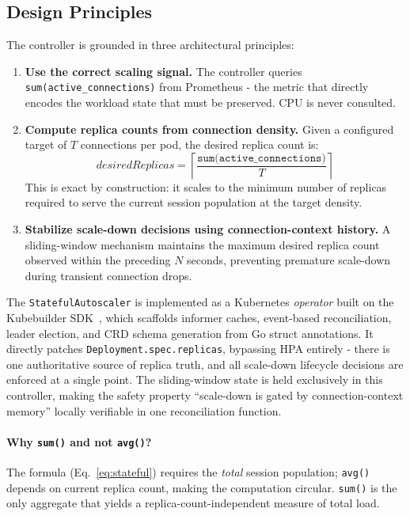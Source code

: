 \documentclass[3p,twocolumn]{elsarticle}
\theoremstyle{plain}%
\theoremstyle{definition}%
\begin{document}
\subsection{Design Principles}

The controller is grounded in three architectural principles:

\begin{enumerate}[leftmargin=*]
\item \textbf{Use the correct scaling signal.} The controller queries
  \texttt{sum(active\_connections)} from Prometheus - the metric that directly encodes the
  workload state that must be preserved. CPU is never consulted.

\item \textbf{Compute replica counts from connection density.} Given a configured target of
  $T$ connections per pod, the desired replica count is:
  \begin{equation}
  \textit{desiredReplicas} = \left\lceil \frac{\texttt{sum(active\_connections)}}{T} \right\rceil
  \label{eq:stateful}
  \end{equation}
  This is exact by construction: it scales to the minimum number of replicas required to
  serve the current session population at the target density.

\item \textbf{Stabilize scale-down decisions using connection-context history.} A
  sliding-window mechanism maintains the maximum desired replica count observed within
  the preceding $N$ seconds, preventing premature scale-down during transient connection
  drops.
\end{enumerate}

The \texttt{StatefulAutoscaler} is implemented as a Kubernetes \textit{operator} built on the Kubebuilder SDK~\cite{kubebuilder_docs}, which scaffolds informer caches, event-based reconciliation, leader election, and CRD schema generation from Go struct annotations. It directly patches \texttt{Deployment.spec.replicas}, bypassing HPA entirely - there is one authoritative source of replica truth, and all scale-down lifecycle decisions are enforced at a single point. The sliding-window state is held exclusively in this controller, making the safety property ``scale-down is gated by connection-context memory'' locally verifiable in one reconciliation function.

\paragraph{Why \texttt{sum()} and not \texttt{avg()}?}
The formula (Eq.~\ref{eq:stateful}) requires the \textit{total} session population; \texttt{avg()} depends on current replica count, making the computation circular. \texttt{sum()} is the only aggregate that yields a replica-count-independent measure of total load.
\end{document}
